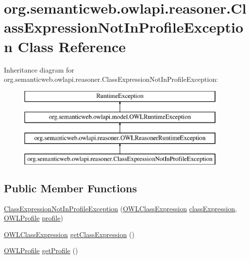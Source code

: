 \hypertarget{classorg_1_1semanticweb_1_1owlapi_1_1reasoner_1_1_class_expression_not_in_profile_exception}{\section{org.\-semanticweb.\-owlapi.\-reasoner.\-Class\-Expression\-Not\-In\-Profile\-Exception Class Reference}
\label{classorg_1_1semanticweb_1_1owlapi_1_1reasoner_1_1_class_expression_not_in_profile_exception}
}
Inheritance diagram for org.\-semanticweb.\-owlapi.\-reasoner.\-Class\-Expression\-Not\-In\-Profile\-Exception\-:\begin{figure}[H]
\begin{center}
\leavevmode
\includegraphics[height=4.000000cm]{classorg_1_1semanticweb_1_1owlapi_1_1reasoner_1_1_class_expression_not_in_profile_exception}
\end{center}
\end{figure}
\subsection*{Public Member Functions}
\begin{DoxyCompactItemize}
\item 
\hyperlink{classorg_1_1semanticweb_1_1owlapi_1_1reasoner_1_1_class_expression_not_in_profile_exception_a0164056d2558c4610168ee353e7826f2}{Class\-Expression\-Not\-In\-Profile\-Exception} (\hyperlink{interfaceorg_1_1semanticweb_1_1owlapi_1_1model_1_1_o_w_l_class_expression}{O\-W\-L\-Class\-Expression} \hyperlink{classorg_1_1semanticweb_1_1owlapi_1_1reasoner_1_1_class_expression_not_in_profile_exception_a5305eb3833162f7e0f008b0050731cf6}{class\-Expression}, \hyperlink{interfaceorg_1_1semanticweb_1_1owlapi_1_1profiles_1_1_o_w_l_profile}{O\-W\-L\-Profile} \hyperlink{classorg_1_1semanticweb_1_1owlapi_1_1reasoner_1_1_class_expression_not_in_profile_exception_afd11ad29c663e65803aec4c859d322aa}{profile})
\item 
\hyperlink{interfaceorg_1_1semanticweb_1_1owlapi_1_1model_1_1_o_w_l_class_expression}{O\-W\-L\-Class\-Expression} \hyperlink{classorg_1_1semanticweb_1_1owlapi_1_1reasoner_1_1_class_expression_not_in_profile_exception_a579f0debb61ad57f2c2001063e53b242}{get\-Class\-Expression} ()
\item 
\hyperlink{interfaceorg_1_1semanticweb_1_1owlapi_1_1profiles_1_1_o_w_l_profile}{O\-W\-L\-Profile} \hyperlink{classorg_1_1semanticweb_1_1owlapi_1_1reasoner_1_1_class_expression_not_in_profile_exception_a2d1f043654c1f0eb917acb56080fcf63}{get\-Profile} ()
\end{DoxyCompactItemize}
